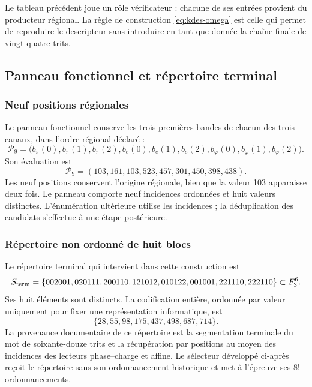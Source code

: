 Le tableau précédent joue un rôle vérificateur : chacune de ses entrées provient du producteur régional. La règle de construction \eqref{eq:kdes-omega} est celle qui permet de reproduire le descripteur sans introduire en tant que donnée la chaîne finale de vingt-quatre trits.

\subsection{Panneau fonctionnel et répertoire terminal}

\subsubsection{Neuf positions régionales}

Le panneau fonctionnel conserve les trois premières bandes de chacun des trois canaux, dans l'ordre régional déclaré :
\begin{equation}
 \mathcal P_9=
 \bigl(b_\pi(0),b_\pi(1),b_\pi(2),
       b_e(0),b_e(1),b_e(2),
       b_\varphi(0),b_\varphi(1),b_\varphi(2)\bigr).
 \label{eq:kdes-panel}
\end{equation}
Son évaluation est
\[
 \mathcal P_9=(103,161,103,523,457,301,450,398,438).
\]
Les neuf positions conservent l'origine régionale, bien que la valeur
103 apparaisse deux fois. Le panneau comporte neuf incidences ordonnées et
huit valeurs distinctes. L'énumération ultérieure utilise les incidences ;
la déduplication des candidats s'effectue à une étape postérieure.

\subsubsection{Répertoire non ordonné de huit blocs}

Le répertoire terminal qui intervient dans cette construction est
\begin{equation}
 \mathcal S_{\rm term}=
 \{002001,020111,200110,121012,
   010122,001001,221110,222110\}\subset\mathbb F_3^6.
 \label{eq:kdes-sterm}
\end{equation}
Ses huit éléments sont distincts. La codification entière, ordonnée par
valeur uniquement pour fixer une représentation informatique, est
\[
 \{28,55,98,175,437,498,687,714\}.
\]
La provenance documentaire de ce répertoire est la segmentation terminale du mot de soixante-douze trits et la récupération par positions au moyen des incidences des lecteurs phase--charge et affine. Le sélecteur développé ci-après reçoit le répertoire sans son ordonnancement historique et met à l'épreuve ses $8!$ ordonnancements.


